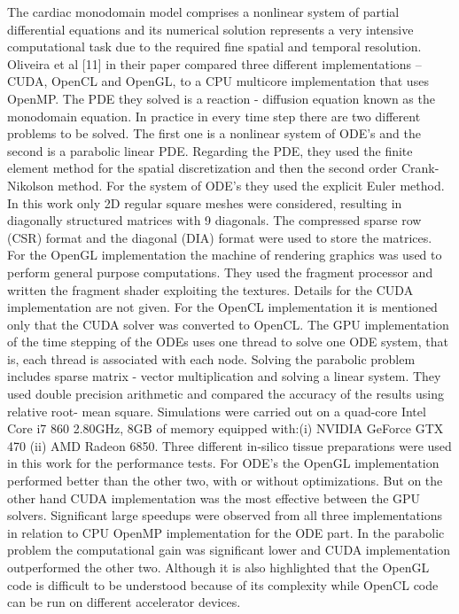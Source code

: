 The cardiac monodomain model comprises a nonlinear system of partial differential equations and its numerical solution represents a very intensive computational task due to the required fine spatial and temporal resolution. Oliveira et al [11] in their paper compared three different implementations –CUDA, OpenCL and OpenGL, to a CPU multicore implementation that uses OpenMP. The PDE they solved is a reaction - diffusion equation known as the monodomain equation. In practice in every time step there are two different problems to be solved. The first one is a nonlinear system of ODE’s and the second is a parabolic linear PDE. Regarding the PDE, they used the finite element method for the spatial discretization and then the second order Crank-Nikolson method. For the system of ODE’s they used the explicit Euler method. In this work only 2D regular square meshes were considered, resulting in diagonally structured matrices with 9 diagonals. The compressed sparse row (CSR) format and the diagonal (DIA) format were used to store the matrices. For the OpenGL implementation the machine of rendering graphics was used to perform general purpose computations. They used the fragment processor and written the fragment shader exploiting the textures. Details for the CUDA implementation are not given. For the OpenCL implementation it is mentioned only that the CUDA solver was converted to OpenCL. The GPU implementation of the time stepping of the ODEs uses one thread to solve one ODE system, that is, each thread is associated with each node. Solving the parabolic problem includes sparse matrix - vector multiplication and solving a linear system. They used double precision arithmetic and compared the accuracy of the results using relative root- mean square. Simulations were carried out on a quad-core Intel Core i7 860 2.80GHz, 8GB of memory equipped with:(i) NVIDIA GeForce GTX 470 (ii) AMD Radeon 6850. Three different in-silico tissue preparations were used in this work for the performance tests. For ODE’s the OpenGL implementation performed better than the other two, with or without optimizations. But on the other hand CUDA implementation was the most effective between the GPU solvers. Significant large speedups were observed from all three implementations in relation to CPU OpenMP implementation for the ODE part. In the parabolic problem the computational gain was significant lower and CUDA implementation outperformed the other two. Although it is also highlighted that the OpenGL code is difficult to be understood because of its complexity while OpenCL code can be run on different accelerator devices.


